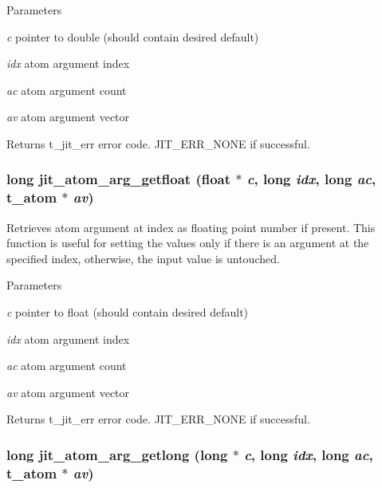 \begin{DoxyParams}{Parameters}
\item[{\em c}]pointer to double (should contain desired default) \item[{\em idx}]atom argument index \item[{\em ac}]atom argument count \item[{\em av}]atom argument vector\end{DoxyParams}
\begin{DoxyReturn}{Returns}
t\_\-jit\_\-err error code. JIT\_\-ERR\_\-NONE if successful. 
\end{DoxyReturn}
\hypertarget{group__atommod_gaa75d6ca44c5972162eb78ce62b7c39d1}{
\subsubsection[{jit\_\-atom\_\-arg\_\-getfloat}]{\setlength{\rightskip}{0pt plus 5cm}long jit\_\-atom\_\-arg\_\-getfloat (float $\ast$ {\em c}, \/  long {\em idx}, \/  long {\em ac}, \/  {\bf t\_\-atom} $\ast$ {\em av})}}
\label{group__atommod_gaa75d6ca44c5972162eb78ce62b7c39d1}


Retrieves atom argument at index as floating point number if present. This function is useful for setting the values only if there is an argument at the specified index, otherwise, the input value is untouched.


\begin{DoxyParams}{Parameters}
\item[{\em c}]pointer to float (should contain desired default) \item[{\em idx}]atom argument index \item[{\em ac}]atom argument count \item[{\em av}]atom argument vector\end{DoxyParams}
\begin{DoxyReturn}{Returns}
t\_\-jit\_\-err error code. JIT\_\-ERR\_\-NONE if successful. 
\end{DoxyReturn}
\hypertarget{group__atommod_ga4ef6f5e500d63209a1fd5e14c49b2fa3}{
\subsubsection[{jit\_\-atom\_\-arg\_\-getlong}]{\setlength{\rightskip}{0pt plus 5cm}long jit\_\-atom\_\-arg\_\-getlong (long $\ast$ {\em c}, \/  long {\em idx}, \/  long {\em ac}, \/  {\bf t\_\-atom} $\ast$ {\em av})}}
\label{group__atommod_ga4ef6f5e500d63209a1fd5e14c49b2fa3}


